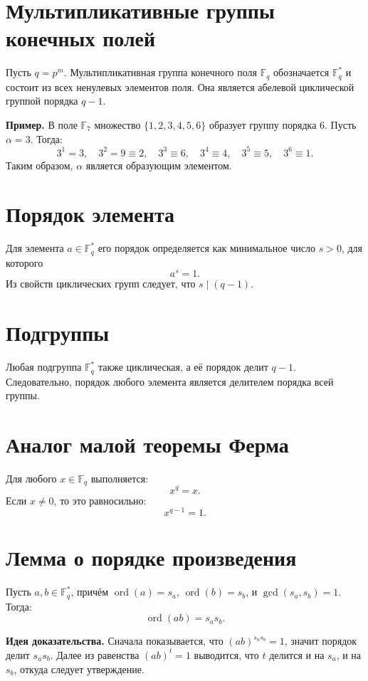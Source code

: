\documentclass[a4paper,12pt]{article}
\begin{document}
\section*{Мультипликативные группы конечных полей}

Пусть $q = p^m$. Мультипликативная группа конечного поля $\mathbb{F}_q$ обозначается $\mathbb{F}_q^*$ и состоит из всех ненулевых элементов поля. Она является абелевой циклической группой порядка $q-1$.

\textbf{Пример.} В поле $\mathbb{F}_7$ множество $\{1,2,3,4,5,6\}$ образует группу порядка $6$. Пусть $\alpha = 3$. Тогда:
\[
3^1 = 3,\quad
3^2 = 9 \equiv 2,\quad
3^3 \equiv 6,\quad
3^4 \equiv 4,\quad
3^5 \equiv 5,\quad
3^6 \equiv 1.
\]
Таким образом, $\alpha$ является образующим элементом.

\section*{Порядок элемента}

Для элемента $a \in \mathbb{F}_q^*$ его порядок определяется как минимальное число $s > 0$, для которого
\[
a^s = 1.
\]
Из свойств циклических групп следует, что $s \mid (q-1)$.

\section*{Подгруппы}

Любая подгруппа $\mathbb{F}_q^*$ также циклическая, а её порядок делит $q-1$. Следовательно, порядок любого элемента является делителем порядка всей группы.

\section*{Аналог малой теоремы Ферма}

Для любого $x \in \mathbb{F}_q$ выполняется:
\[
x^q = x.
\]
Если $x \neq 0$, то это равносильно:
\[
x^{q-1} = 1.
\]

\section*{Лемма о порядке произведения}

Пусть $a,b \in \mathbb{F}_q^*$, причём $\operatorname{ord}(a)=s_a$, $\operatorname{ord}(b)=s_b$, и $\gcd(s_a, s_b)=1$. Тогда:
\[
\operatorname{ord}(ab) = s_a s_b.
\]

\textbf{Идея доказательства.} Сначала показывается, что $(ab)^{s_as_b}=1$, значит порядок делит $s_as_b$. Далее из равенства $(ab)^t=1$ выводится, что $t$ делится и на $s_a$, и на $s_b$, откуда следует утверждение.
\end{document}

